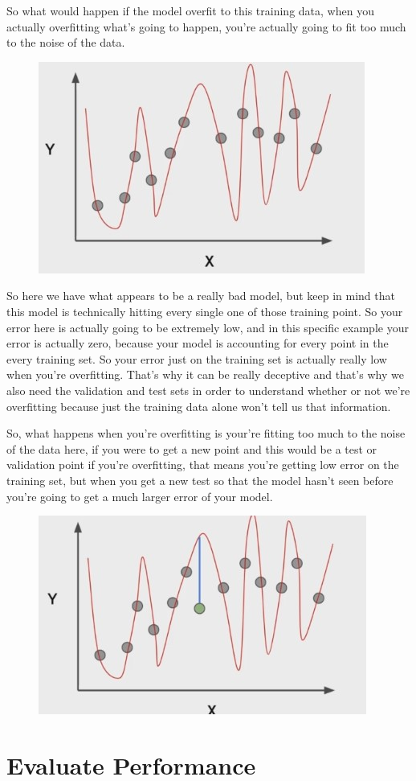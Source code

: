 \documentclass[12pt]{article}
\begin{document}
\begin{itemize}
	So what would happen if the model overfit to this training data, when you actually overfitting what's going to happen, you're actually going to fit too much to the noise of the data.
	\begin{figure}[htbp]
\centerline{\includegraphics[scale=.5]{img/overfittingnoise.jpg}}
\end{figure}

	So here we have what appears to be a really bad model, but keep in mind that this model is technically hitting every single one of those training point. So your error here is actually going to be extremely low, and in this specific example your error is actually zero, because your model is accounting for every point in the every training set. So your error just on the training set is actually really low when you're overfitting. That's why it can be really deceptive and that's why we also need the validation and test sets in order to understand whether or not we're overfitting because just the training data alone won't tell us that information. 
	
	So, what happens when you're overfitting is your're fitting too much to the noise of the data here, if you were to get a new point and this would be a test or validation point if you're overfitting, that means you're getting low error on the training set, but when you get a new test so that the model hasn't seen before you're going to get a much larger error of your model.
		\begin{figure}[htbp]
\centerline{\includegraphics[scale=.5]{img/overfittingLargerError.jpg}}
\end{figure}



	
	
\end{itemize}



\section{Evaluate Performance}
\end{document}
